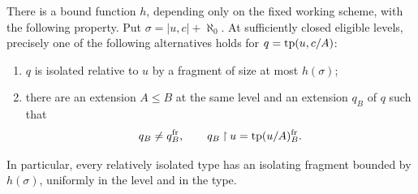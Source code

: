 \begin{proposition}\label{iso:alternative}
There is a bound function $h$, depending only on the fixed working scheme,
with the following property. Put
$\sigma=|u,c|+\aleph_0$. At sufficiently closed eligible levels, precisely
one of the following alternatives holds for $q=\operatorname{tp}(u,c/A)$:
\begin{enumerate}
\item $q$ is isolated relative to $u$ by a fragment of size at most
$h(\sigma)$;
\item there are an extension $A\leq B$ at the same level and an extension
$q_B$ of $q$ such that
\[
 q_B\ne q^{\mathrm{fr}}_B,
 \qquad
 q_B\mathbin{\upharpoonright}u
   =\operatorname{tp}(u/A)^{\mathrm{fr}}_B.
\]
\end{enumerate}
In particular, every relatively isolated type has an isolating fragment
bounded by $h(\sigma)$, uniformly in the level and in the type.
\end{proposition}

